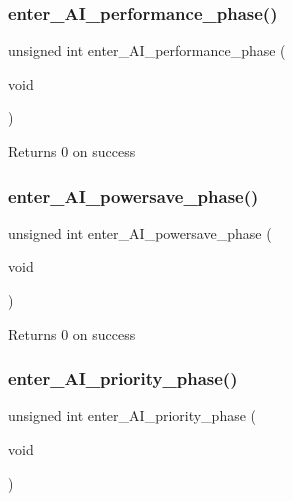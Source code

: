 \subsubsection{\texorpdfstring{enter\+\_\+\+A\+I\+\_\+performance\+\_\+phase()}{enter\_AI\_performance\_phase()}}
{\footnotesize\ttfamily unsigned int enter\+\_\+\+A\+I\+\_\+performance\+\_\+phase (\begin{DoxyParamCaption}\item[{void}]{ }\end{DoxyParamCaption})}

\begin{DoxyReturn}{Returns}
0 on success 
\end{DoxyReturn}
\mbox{\label{group__phase__functions_gaf7784d81e13e0fe9e15b2fa2002ed5b5}} 
\subsubsection{\texorpdfstring{enter\+\_\+\+A\+I\+\_\+powersave\+\_\+phase()}{enter\_AI\_powersave\_phase()}}
{\footnotesize\ttfamily unsigned int enter\+\_\+\+A\+I\+\_\+powersave\+\_\+phase (\begin{DoxyParamCaption}\item[{void}]{ }\end{DoxyParamCaption})}

\begin{DoxyReturn}{Returns}
0 on success 
\end{DoxyReturn}
\mbox{\label{group__phase__functions_ga29bc2053775769341c5ce4cb36bc88d2}} 
\subsubsection{\texorpdfstring{enter\+\_\+\+A\+I\+\_\+priority\+\_\+phase()}{enter\_AI\_priority\_phase()}}
{\footnotesize\ttfamily unsigned int enter\+\_\+\+A\+I\+\_\+priority\+\_\+phase (\begin{DoxyParamCaption}\item[{void}]{ }\end{DoxyParamCaption})}

